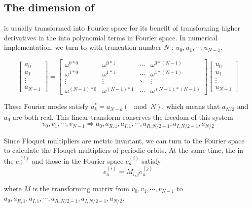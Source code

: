 
\subsection{The dimension of \KSe }

\KSe is usually transformed into Fourier space for its benefit of
transforming higher derivatives in the {\statesp} into polynomial terms
in Fourier space. In numerical implementation, we turn to  \xDft  with
truncation number $N$ :  $u_{0}, u_{1}, \cdots, u_{N-1}$.

\[
	\begin{bmatrix}
	a_{0} \\
	a_{1} \\
	\vdots \\
	a_{N-1}
	\end{bmatrix}
	=
	\begin{bmatrix}
	\omega^{0*0} & \omega^{0*1} & \cdots & \omega^{0*(N-1)}\\
	\omega^{1*0} & \omega^{1*1} & \cdots & \omega^{1*(N-1)}\\
	\vdots & \vdots &\ddots & \vdots \\
	\omega^{(N-1)*0} & \omega^{(N-1)*1} & \cdots & \omega^{(N-1)*(N-1)}
	\end{bmatrix}	
	\begin{bmatrix}
	u_{0} \\
	u_{1} \\
	\vdots \\
	u_{N-1}
	\end{bmatrix}
\]

These Fourier modes satisfy $a^{*}_k=a_{N-k} (\mod N)$, which means that
$a_{N/2}$ and $a_{0}$ are both real. This linear transform conserves the freedom
of this system
\[
v_{0},	v_{1},\cdots , v_{N-1} \Rightarrow a_{0}, a_{R,1}, a_{I,1}, \cdots ,
a_{R,N/2-1}, a_{I,N/2-1}, a_{N/2}
\]

Since Floquet multipliers are metric invariant, we can turn to the
Fourier space to calculate the Flouqet multipliers of periodic orbits. At
the same time, the {\cLvs} in the {\statesp} $e^{(i)}_{u}$  and those in
the Fourier space $e^{(i)}_{a}$  satisfy
\[
	e^{(i)}_{a}=M_{i,j}e^{(j)}_{u}
\]

where $M$ is the transforming matrix from $v_{0},	v_{1},\cdots , v_{N-1}$ to \\
$a_{0}, a_{R,1}, a_{I,1}, \cdots , a_{R,N/2-1}, a_{I,N/2-1}, a_{N/2} $.


